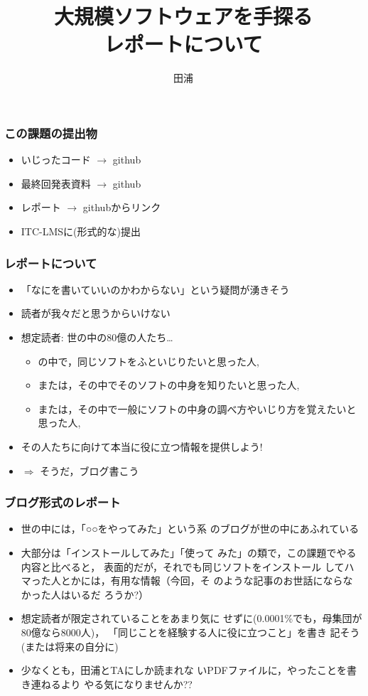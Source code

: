 \documentclass[12pt,dvipdfmx]{beamer}
\title{大規模ソフトウェアを手探る \\ レポートについて}
\institute{}
\author{田浦}
\date{}
\newcommand{\aka}[1]{{\color{red}#1}}
\begin{document}
\maketitle

\begin{frame}
\frametitle{この課題の提出物}
\begin{itemize}
\item いじったコード $\rightarrow$ github
\item 最終回発表資料 $\rightarrow$ github
\item \aka{レポート} $\rightarrow$ githubからリンク
\item ITC-LMSに(形式的な)提出
\end{itemize}
\end{frame}


\begin{frame}
\frametitle{レポートについて}
\begin{itemize}
\item<1-> 「なにを書いていいのかわからない」という疑問が湧きそう
\item<2-> 読者が我々だと思うからいけない
\item<3-> 想定読者: 世の中の80億の人たち\ldots 
  \begin{itemize}
  \item の中で，同じソフトをふといじりたいと思った人, 
  \item または，その中でそのソフトの中身を知りたいと思った人, 
  \item または，その中で一般にソフトの中身の調べ方やいじり方を覚えたいと思った人, 
  \end{itemize}
\item<4-> その人たちに向けて本当に役に立つ情報を提供しよう!
\item<5-> $\Rightarrow$ そうだ，\aka{ブログ書こう}
\end{itemize}
\end{frame}

\begin{frame}
\frametitle{ブログ形式のレポート}
\begin{itemize}

\item<1-> 世の中には，「○○をやってみた」という系
  のブログが世の中にあふれている

\item<2-> 大部分は「インストールしてみた」「使って
  みた」の類で，この課題でやる内容と比べると，
  表面的だが，それでも同じソフトをインストール
  してハマった人とかには，有用な情報（今回，そ
  のような記事のお世話にならなかった人はいるだ
  ろうか?）

\item<3-> 想定読者が限定されていることをあまり気に
  せずに(0.0001\%でも，母集団が80億なら8000人)，
  「同じことを経験する人に役に立つこと」を書き
  記そう(または将来の自分に)

\item<4-> 少なくとも，田浦とTAにしか読まれな
  いPDFファイルに，やったことを書き連ねるより
  やる気になりませんか??
\end{itemize}
\end{frame}
\end{document}
